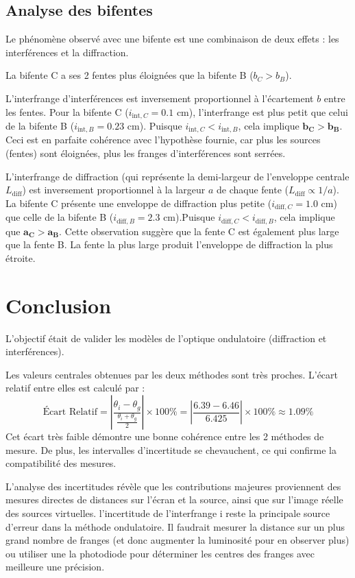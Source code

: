 \documentclass[a4paper,10pt,french]{scrartcl}
\begin{document}
\subsection{Analyse des bifentes}
Le phénomène observé avec une bifente est une combinaison de deux effets : les interférences et la diffraction.

La bifente C a ses 2 fentes plus éloignées que la bifente B ($b_C > b_B$).

L'interfrange d'interférences est inversement proportionnel à l'écartement $b$ entre les fentes.
Pour la bifente C ($i_{\text{int}, C} = 0.1 \text{ cm}$), l'interfrange est plus petit que celui de la bifente B ($i_{\text{int}, B} = 0.23 \text{ cm}$).
Puisque $i_{\text{int}, C} < i_{\text{int}, B}$, cela implique $\mathbf{b_C > b_B}$.
Ceci est en parfaite cohérence avec l'hypothèse fournie, car plus les sources (fentes) sont éloignées, plus les franges d'interférences sont serrées.

L'interfrange de diffraction (qui représente la demi-largeur de l'enveloppe centrale $L_{\text{diff}}$) est inversement proportionnel à la largeur $a$ de chaque fente ($L_{\text{diff}} \propto 1/a$).
La bifente C présente une enveloppe de diffraction plus petite ($i_{\text{diff}, C} = 1.0 \text{ cm}$) que celle de la bifente B ($i_{\text{diff}, B} = 2.3 \text{ cm}$).Puisque $i_{\text{diff}, C} < i_{\text{diff}, B}$, cela implique que $\mathbf{a_C > a_B}$.
Cette observation suggère que la fente C est également plus large que la fente B. La fente la plus large produit l'enveloppe de diffraction la plus étroite.

\section{Conclusion}
L'objectif était de valider les modèles de l'optique ondulatoire (diffraction et interférences).

Les valeurs centrales obtenues par les deux méthodes sont très proches. L'écart relatif entre elles est calculé par :
$$ \text{Écart Relatif} = \left|\frac{\theta_{i} - \theta_{g}}{\frac{\theta_{i} + \theta_{g}}{2}}\right| \times 100 \% = \left|\frac{6.39 - 6.46}{6.425}\right| \times 100 \% \approx 1.09 \% $$
Cet écart très faible démontre une bonne cohérence entre les 2 méthodes de mesure. De plus, les intervalles d'incertitude se chevauchent, ce qui confirme la compatibilité des mesures.

L'analyse des incertitudes révèle que les contributions majeures proviennent des mesures directes de distances sur l'écran et la source, ainsi que sur l'image réelle des sources virtuelles. l'incertitude de l'interfrange i reste la principale source d'erreur dans la méthode ondulatoire. Il faudrait mesurer la distance sur un plus grand nombre de franges (et donc augmenter la luminosité pour en observer plus) ou utiliser une la photodiode pour déterminer les centres des franges avec meilleure une précision.
\end{document}
